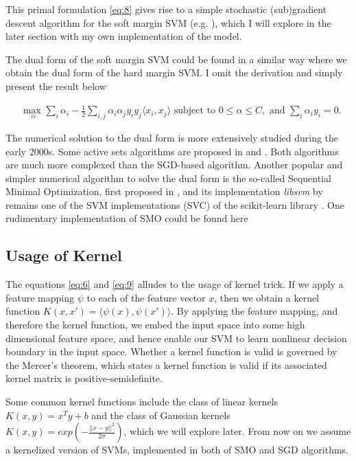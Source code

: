 \documentclass[10pt]{article}
\begin{document}
This primal formulation \eqref{eq:8} gives rise to a simple stochastic (sub)gradient descent algorithm for the soft margin SVM (e.g. \cite{shalev2007online}), which I will explore in the later section with my own implementation of the model.

The dual form of the soft margin SVM could be found in a similar way where we obtain the dual form of the hard margin SVM. I omit the derivation and simply present the result below

\begin{equation} \label{eq:9}
\begin{aligned}
& \underset{\alpha}{\text{max }} 
\sum_{i}^{}\alpha_i - \frac{1}{2} \sum_{i,j}^{}\alpha_i \alpha_j y_i y_j \langle x_i, x_j\rangle
\text{ subject to }
0 \leq \alpha \leq C, \text{ and }
\sum_{i}^{} \alpha_i y_i = 0.
\end{aligned}
\end{equation}

The numerical solution to the dual form is more extensively studied during the early 2000s. Some active sets algorithms are proposed in \cite{scheinberg2006efficient} and \cite{vogt2005active}. Both algorithms are much more complexed than the SGD-based algorithm. Another popular and simpler numerical algorithm to solve the dual form is the so-called Sequential Minimal Optimization, first proposed in \cite{platt1998sequential}, and its implementation \textit{libsvm} by \cite{CC01a} remains one of the SVM implementations (SVC) of the scikit-learn library \cite{scikit-learn}. One rudimentary implementation of SMO could be found here \cite{svm_smo_impl}  

\subsection{Usage of Kernel}
The equations \eqref{eq:6} and \eqref{eq:9} alludes to the usage of kernel trick. If we apply a feature mapping $\psi$ to each of the feature vector $x$, then we obtain a kernel function $K(x,x') = \langle \psi(x), \psi(x')\rangle$. By applying the feature mapping, and therefore the kernel function, we embed the input space into some high dimensional feature space, and hence enable our SVM to learn nonlinear decision boundary in the input space. Whether a kernel function is valid is governed by the Mercer's theorem, which states a kernel function is valid if its associated kernel matrix is positive-semidefinite.

Some common kernel functions include the class of linear kernels $K(x,y) = x^T y + b$ and the class of Gaussian kernels $K(x,y) = exp(- \frac{||x - y||^2}{2\sigma})$, which we will explore later. From now on we assume a kernelized version of SVMs, implemented in both of SMO and SGD algorithms. 



{}


	
\end{document}
